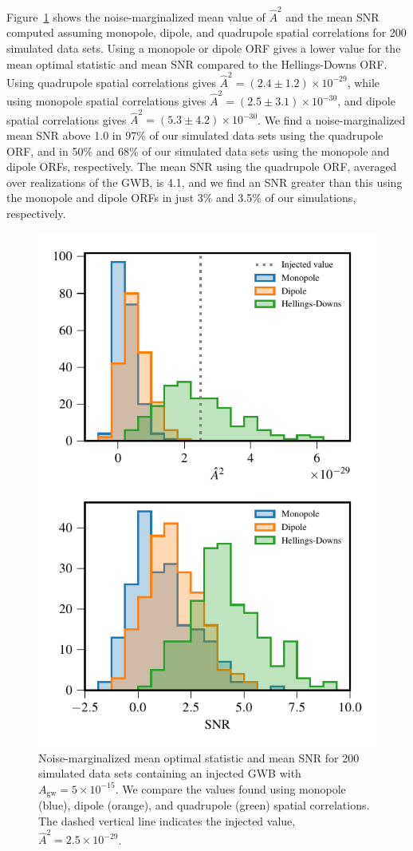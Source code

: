 \documentclass[twocolumn,aps,prd,superscriptaddress]{revtex4-1}
\newcommand{\Agw}{\ensuremath{A_\mathrm{gw}}}
\begin{document}
Figure~\ref{fig:os_ORF} shows the noise-marginalized 
mean value of $\hat{A}^2$ and the mean SNR 
computed assuming monopole, dipole, and quadrupole spatial correlations 
for 200 simulated data sets. Using a monopole or dipole ORF 
gives a lower value for the mean optimal statistic and mean SNR compared to the 
Hellings-Downs ORF. 
Using quadrupole spatial correlations gives $\hat{A}^2 = (2.4 \pm 1.2) \times 10^{-29}$, 
while using monopole spatial correlations gives $\hat{A}^2 = (2.5 \pm 3.1) \times 10^{-30}$, 
and dipole spatial correlations gives $\hat{A}^2 = (5.3 \pm 4.2) \times 10^{-30}$. 
We find a noise-marginalized mean SNR above 1.0 in 97\% of our simulated data sets 
using the quadrupole ORF, and in 50\% and 68\% of our simulated data sets 
using the monopole and dipole ORFs, respectively. 
The mean SNR using the quadrupole ORF, averaged over realizations of the GWB, is 4.1, 
and we find an SNR greater than this using the monopole and dipole ORFs in just 
3\% and 3.5\% of our simulations, respectively.
\begin{figure}[t]
	\includegraphics[width=0.9\columnwidth]{plots/optstat_spatial_A5e-15.pdf}
	\caption{Noise-marginalized mean optimal statistic and mean SNR for 200 simulated data sets 
			containing an injected GWB with $\Agw = 5\times10^{-15}$. 
			We compare the values found using monopole (blue), dipole (orange), 
			and quadrupole (green) spatial correlations. 
			The dashed vertical line indicates the injected value, $\hat{A}^2 = 2.5 \times 10^{-29}$.}
	\label{fig:os_ORF}
\end{figure}
\end{document}
